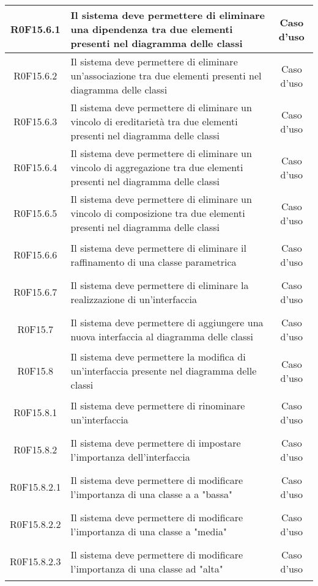 \documentclass[../AnalisiDeiRequisiti.tex]{subfiles}
\begin{document}
\begin{longtable}{|c|>{\centering}p{7cm}|c|}
	\hypertarget{R0F15.6.1}{R0F15.6.1} & Il sistema deve permettere di eliminare una dipendenza tra due elementi presenti nel diagramma delle classi & Caso d'uso \\ \hline
	\hypertarget{R0F15.6.2}{R0F15.6.2} & Il sistema deve permettere di eliminare un'associazione tra due elementi presenti nel diagramma delle classi & Caso d'uso \\ \hline
	\hypertarget{R0F15.6.3}{R0F15.6.3} & Il sistema deve permettere di eliminare un vincolo di ereditarietà tra due elementi presenti nel diagramma delle classi & Caso d'uso \\ \hline
	\hypertarget{R0F15.6.4}{R0F15.6.4} & Il sistema deve permettere di eliminare un vincolo di aggregazione tra due elementi presenti nel diagramma delle classi & Caso d'uso \\ \hline
	\hypertarget{R0F15.6.5}{R0F15.6.5} & Il sistema deve permettere di eliminare un vincolo di composizione tra due elementi presenti nel diagramma delle classi & Caso d'uso \\ \hline
	\hypertarget{R0F15.6.6}{R0F15.6.6} & Il sistema deve permettere di eliminare il raffinamento di una classe parametrica  & Caso d'uso \\ \hline
	\hypertarget{R0F15.6.7}{R0F15.6.7} & Il sistema deve permettere di eliminare la realizzazione di un'interfaccia & Caso d'uso \\ \hline
	\hypertarget{R0F15.7}{R0F15.7} & Il sistema deve permettere di aggiungere una nuova interfaccia al diagramma delle classi & Caso d'uso \\ \hline
	\hypertarget{R0F15.8}{R0F15.8} & Il sistema deve permettere la modifica di un'interfaccia presente nel diagramma delle classi & Caso d'uso \\ \hline
	\hypertarget{R0F15.8.1}{R0F15.8.1} & Il sistema deve permettere di rinominare un'interfaccia & Caso d'uso \\ \hline
	\hypertarget{R0F15.8.2}{R0F15.8.2} & Il sistema deve permettere di impostare l'importanza dell'interfaccia & Caso d'uso \\ \hline
	\hypertarget{R0F15.8.2.1}{R0F15.8.2.1} & Il sistema deve permettere di modificare l'importanza di una classe a a "bassa" & Caso d'uso \\ \hline
	\hypertarget{R0F15.8.2.2}{R0F15.8.2.2} & Il sistema deve permettere di modificare l'importanza di una classe a "media" & Caso d'uso \\ \hline
	\hypertarget{R0F15.8.2.3}{R0F15.8.2.3} & Il sistema deve permettere di modificare l'importanza di una classe ad "alta" & Caso d'uso \\ \hline

\end{longtable}
\end{document}
